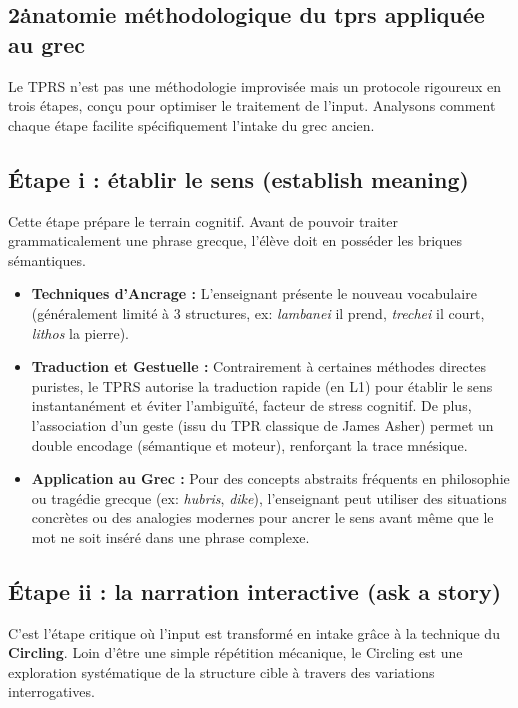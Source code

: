 \subsection{2\. anatomie méthodologique du tprs appliquée au grec}

Le TPRS n'est pas une méthodologie improvisée mais un protocole rigoureux en trois étapes, conçu
pour optimiser le traitement de l'input. Analysons comment chaque étape facilite spécifiquement
l'intake du grec ancien.



\subsection{Étape i : établir le sens (establish meaning)}

Cette étape prépare le terrain cognitif. Avant de pouvoir traiter grammaticalement une phrase
grecque, l'élève doit en posséder les briques sémantiques.

\begin{itemize}\item \textbf{Techniques d'Ancrage :} L'enseignant présente le nouveau vocabulaire (généralement limité à 3 structures, ex: \textit{lambanei} \- il prend, \textit{trechei} \- il court, \textit{lithos} \- la pierre).\item \textbf{Traduction et Gestuelle :} Contrairement à certaines méthodes directes puristes, le TPRS autorise la traduction rapide (en L1) pour établir le sens instantanément et éviter l'ambiguïté, facteur de stress cognitif. De plus, l'association d'un geste (issu du TPR classique de James Asher) permet un double encodage (sémantique et moteur), renforçant la trace mnésique.\cite{III-2-3-ref2}\item \textbf{Application au Grec :} Pour des concepts abstraits fréquents en philosophie ou tragédie grecque (ex: \textit{hubris}, \textit{dike}), l'enseignant peut utiliser des situations concrètes ou des analogies modernes pour ancrer le sens avant même que le mot ne soit inséré dans une phrase complexe.\cite{III-2-3-ref2}\end{itemize}

\subsection{Étape ii : la narration interactive (ask a story)}

C'est l'étape critique où l'input est transformé en intake grâce à la technique du
\textbf{Circling}. Loin d'être une simple répétition mécanique, le Circling est une exploration
systématique de la structure cible à travers des variations interrogatives.



